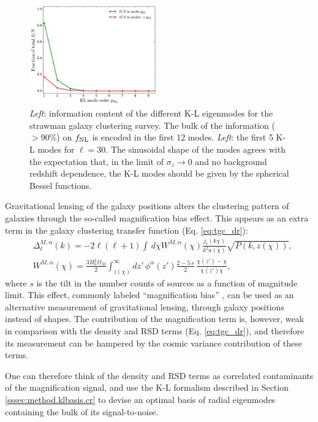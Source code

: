 \documentclass[twocolumn,amsfont,amssymb,amsmath, showpacs,balancelastpage, nofootinbib]{revtex4-1}
\begin{document}
    \begin{figure}
      \centering
      \includegraphics[width=0.49\textwidth]{Figs/information_mb}
      \caption{{\sl Left}: information content of the different K-L eigenmodes for the strawman galaxy clustering survey. The bulk of the information ($>90\%$) on $f_{\rm NL}$ is encoded in the first 12 modes. {\sl Left}: the first 5 K-L modes for $\ell=30$. The sinusoidal shape of the modes agrees with the expectation that, in the limit of $\sigma_z\rightarrow0$ and no background redshift dependence, the K-L modes should be given by the spherical Bessel functions. }\label{fig:kl_mb}
    \end{figure}
    Gravitational lensing of the galaxy positions alters the clustering pattern of galaxies through the so-called magnification bias effect. This appears as an extra term in the galaxy clustering transfer function (Eq. \ref{eq:tgc_dr}):
    \begin{align}\nonumber
      &\Delta^{M,\alpha}_\ell(k)=-2\ell(\ell+1)\int\,d\chi W^{M,\alpha}(\chi)\frac{j_\ell(k\chi)}{k^2a(\chi)}\sqrt{P(k,z(\chi))},\\
      &W^{M,\alpha}(\chi)=\frac{3H_0^2\Omega_M}{2}\int_{z(\chi)}^\infty dz'\,\phi^\alpha(z')\frac{2-5\,s}{2}\,\frac{\chi(z')-\chi}{\chi(z')\chi},
    \end{align}
    where $s$ is the tilt in the number counts of sources as a function of magnitude limit. This effect, commonly labeled ``magnification bias'' \cite{1967ApJ...147...61G,2000ApJ...537L..77M,2008PhRvD..77b3512L}, can be used as an alternative measurement of gravitational lensing, through galaxy positions instead of shapes. The contribution of the magnification term is, however, weak in comparison with the density and RSD terms (Eq. \ref{eq:tgc_dr}), and therefore its measurement can be hampered by the cosmic variance contribution of these terms.
    
    One can therefore think of the density and RSD terms as correlated contaminants of the magnification signal, and use the K-L formalism described in Section \ref{sssec:method.klbasis.cr} to devise an optimal basis of radial eigenmodes containing the bulk of its signal-to-noise.
    
\end{document}
